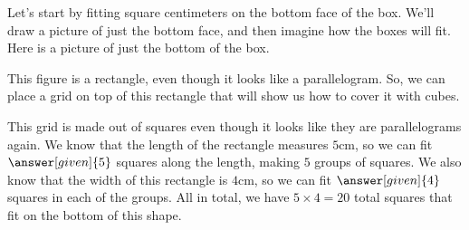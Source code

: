 \documentclass{ximera}
\begin{document}
\begin{example}
Let's start by fitting square centimeters on the bottom face of the box. We'll draw a picture of just the bottom face, and then imagine how the boxes will fit. Here is a picture of just the bottom of the box.
\begin{image}
\end{image}
This figure is a rectangle, even though it looks like a parallelogram. So, we can place a grid on top of this rectangle that will show us how to cover it with cubes.
\begin{image}
\end{image}
This grid is made out of squares even though it looks like they are parallelograms again. We know that the length of the rectangle measures $5$cm, so we can fit $\answer[given]{5}$ squares along the length, making $5$ groups of squares. We also know that the width of this rectangle is $4$cm, so we can fit $\answer[given]{4}$ squares in each of the groups. All in total, we have $5 \times 4 = 20$ total squares that fit on the bottom of this shape.


\end{example}
\end{document}

